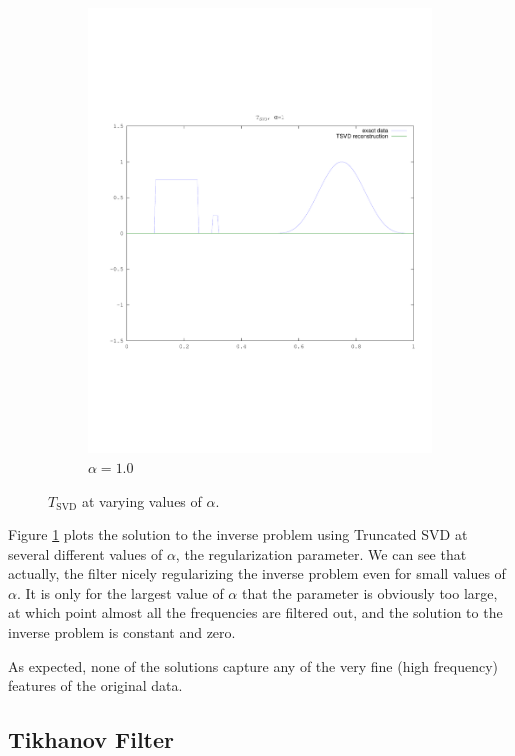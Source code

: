 \documentclass{article}
\begin{document}
\begin{figure}[!htb]
\begin{subfigure}[bh]{0.45\textwidth}
                \includegraphics[width=\textwidth]{plots/tsvd1.pdf}
                \caption{$\alpha=1.0$}
        \end{subfigure}
        \caption{$T_{\text{SVD}}$ at varying values of $\alpha$.}
        \label{fig:svd}
\end{figure}

Figure \ref{fig:svd} plots the solution to the inverse problem using
Truncated SVD at several different values of $\alpha$, the
regularization parameter. We can see that actually, the filter nicely
regularizing the inverse problem even for small values of $\alpha$. It
is only for the largest value of $\alpha$ that the parameter is obviously
too large, at which point almost all the frequencies are filtered out,
and the solution to the inverse problem is constant and zero. 

As expected, none of the solutions capture any of the very fine (high
frequency) features of the original data. 

\subsection{Tikhanov Filter}
\end{document}
